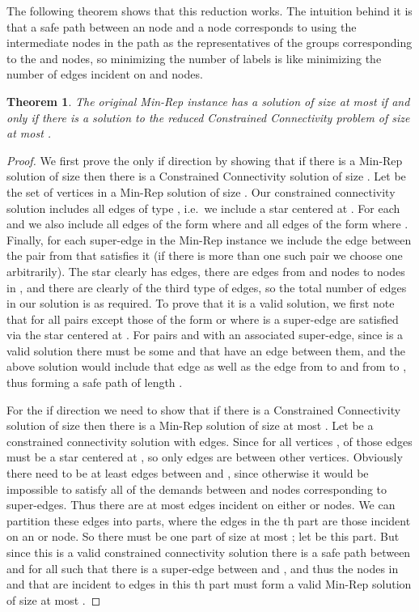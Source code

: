 \documentclass[11pt,letterpaper]{article}
\newtheorem{theorem}{Theorem}[section]
\theoremstyle{definition}
\newcounter{note}[section]
\begin{document}
The following theorem shows that this reduction works.  The intuition behind it is that a safe path between an  node and a  node corresponds to using the intermediate nodes in the path as the representatives of the groups corresponding to the  and  nodes, so minimizing the number of labels is like minimizing the number of edges incident on  and  nodes.

\begin{theorem} \label{thm:Subgraph_Reduce}
  The original {\sc Min-Rep} instance has a solution of size at most
   if and only if there is a solution to the reduced Constrained
  Connectivity problem of size at most .
\end{theorem}
\begin{proof}
  We first prove the only if direction by showing that if there is a
  {\sc Min-Rep} solution of size  then there is a Constrained
  Connectivity solution of size .  Let
   be the set of vertices in a Min-Rep solution of size .
  Our constrained connectivity solution includes all edges of type
  , i.e.\ we include a star centered at .  For each 
  and  we also include all edges of the form 
  where  and all edges of the form  where .  Finally, for each super-edge
  in the Min-Rep instance we include the edge between the pair from
   that satisfies it (if there is more than one such pair we
  choose one arbitrarily).  The star clearly has  edges,
  there are  edges from  and  nodes to nodes in ,
  and there are clearly  of the third type of edges, so the
  total number of edges in our solution is  as required.  To prove that it is a valid solution, we first
  note that for all pairs except those of the form  or
   where  is a super-edge are satisfied
  via the star centered at .  For pairs  and
   with an associated super-edge, since  is
  a valid solution there must be some  and  that have an edge between them, and the above
  solution would include that edge as well as the edge from  to
   and from  to , thus forming a safe path of length .

  For the if direction we need to show that if there is a Constrained
  Connectivity solution of size  then
  there is a Min-Rep solution of size at most .  Let  be
  a constrained connectivity solution with  edges.  Since  for all vertices ,  of those edges must be a star centered at , so only  edges are between other vertices.  Obviously there need to
  be at least  edges between  and , since otherwise it
  would be impossible to satisfy all of the demands between  and
   nodes corresponding to super-edges.  Thus there are at most 
  edges incident on either  or  nodes.  We can partition these
  edges into  parts, where the edges in the th part are those
  incident on an  or  node.  So there must be one part of
  size at most ; let  be this part.  But since this is a valid
  constrained connectivity solution there is a safe path between
   and  for all  such that there is a
  super-edge between  and , and thus the nodes in 
  and  that are incident to edges in this th part must form a
  valid Min-Rep solution of size at most .
\end{proof}
\end{document}
